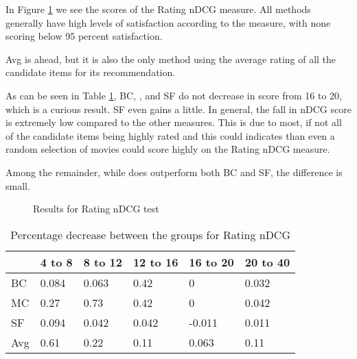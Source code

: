In Figure \ref{fig:andcg} we see the scores of the Rating nDCG measure. All methods generally have high levels of satisfaction according to the measure, with none scoring below 95 percent satisfaction.

Avg is ahead, but it is also the only method using the average rating of all the candidate items for its recommendation.

As can be seen in Table \ref{tbl:andcg}, BC, \MC, and SF do not decrease in score from 16 to 20, which is a curious result. SF even gains a little. In general, the fall in nDCG score is extremely low compared to the other measures. This is due to most, if not all of the candidate items being highly rated and this could indicates than even a random selection of movies could score highly on the Rating nDCG measure.

Among the remainder, while \MC does outperform both BC and SF, the difference is small.
\begin{figure}[H]
	\caption{Results for Rating nDCG test}\label{fig:andcg}
\end{figure}

\begin{table}[H]
	\centering
	\begin{tabular}{|l|lllll|}\hline
		& 4 to 8 & 8 to 12 & 12 to 16 & 16 to 20 & 20 to 40 \\\hline
		BC 	& 0.084	& 0.063	& 0.42	& 0		& 0.032 \\
		MC  & 0.27	& 0.73	& 0.42	& 0		& 0.042 \\
		SF  & 0.094	& 0.042	& 0.042	&-0.011	& 0.011 \\
		Avg	& 0.61	& 0.22 	& 0.11	& 0.063	& 0.11  \\ \hline
	\end{tabular}
	\caption{Percentage decrease between the groups for Rating nDCG}
	\label{tbl:andcg}
\end{table}

